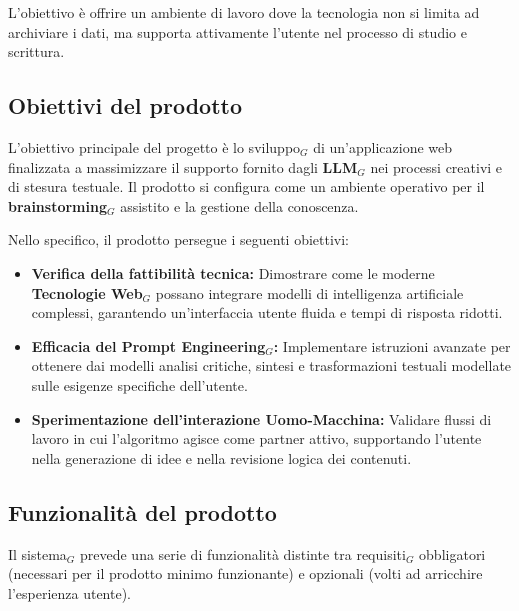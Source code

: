 \documentclass[a4paper, 10pt]{article}
\begin{document}
L'obiettivo è offrire un ambiente di lavoro dove la tecnologia non si limita ad archiviare i dati, ma supporta attivamente l'utente nel processo di studio e scrittura.

\subsection{Obiettivi del prodotto}

L'obiettivo principale del progetto è lo sviluppo$_G$ di un'applicazione web finalizzata a massimizzare il supporto fornito dagli \textbf{LLM}$_G$ nei processi creativi e di stesura testuale. Il prodotto si configura come un ambiente operativo per il \textbf{brainstorming}$_G$ assistito e la gestione della conoscenza.

Nello specifico, il prodotto persegue i seguenti obiettivi:
\begin{itemize}
    \item \textbf{Verifica della fattibilità tecnica:} Dimostrare come le moderne \textbf{Tecnologie Web}$_G$ possano integrare modelli di intelligenza artificiale complessi, garantendo un'interfaccia utente fluida e tempi di risposta ridotti.
    \item \textbf{Efficacia del Prompt Engineering$_G$:} Implementare istruzioni avanzate per ottenere dai modelli analisi critiche, sintesi e trasformazioni testuali modellate sulle esigenze specifiche dell'utente.
    \item \textbf{Sperimentazione dell'interazione Uomo-Macchina:} Validare flussi di lavoro in cui l'algoritmo agisce come partner attivo, supportando l'utente nella generazione di idee e nella revisione logica dei contenuti.
\end{itemize}
\subsection{Funzionalità del prodotto}

Il sistema$_G$ prevede una serie di funzionalità distinte tra requisiti$_G$ obbligatori (necessari per il prodotto minimo funzionante) e opzionali (volti ad arricchire l'esperienza utente).
\end{document}
